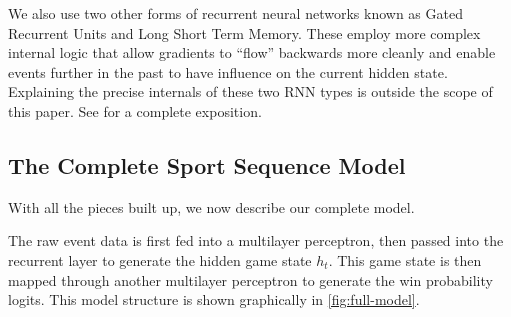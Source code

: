 We also use two other forms of recurrent neural networks known as Gated Recurrent Units and Long Short Term Memory. These employ more complex internal logic that allow gradients to ``flow'' backwards more cleanly and enable events further in the past to have influence on the current hidden state. Explaining the precise internals of these two RNN types is outside the scope of this paper. See \textcite[\S 15.2.7]{PML} for a complete exposition.

\subsection{The Complete Sport Sequence Model}
\label{sec:complete-model}

With all the pieces built up, we now describe our complete model.

The raw event data is first fed into a multilayer perceptron, then passed into the recurrent layer to generate the hidden game state $h_t$. This game state is then mapped through another multilayer perceptron to generate the win probability logits. This model structure is shown graphically in \autoref{fig:full-model}.

